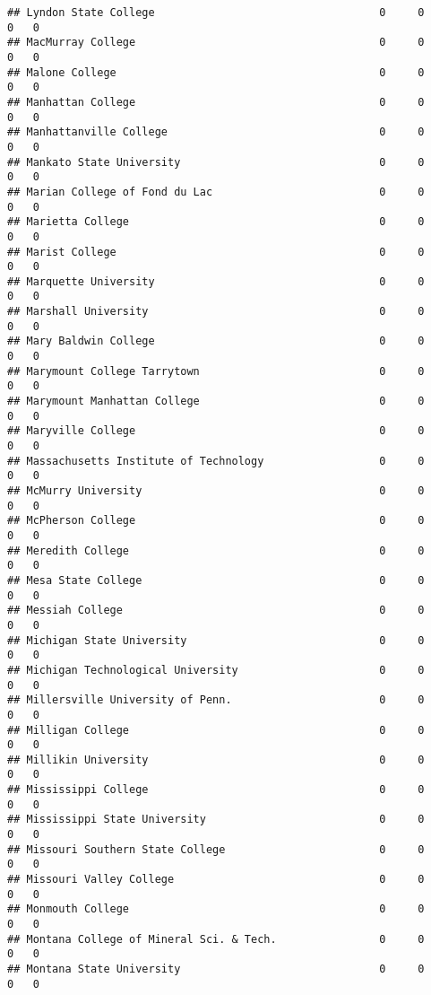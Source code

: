 \documentclass[
]{article}
\begin{document}
\begin{verbatim}
## Lyndon State College                                   0     0        0   0
## MacMurray College                                      0     0        0   0
## Malone College                                         0     0        0   0
## Manhattan College                                      0     0        0   0
## Manhattanville College                                 0     0        0   0
## Mankato State University                               0     0        0   0
## Marian College of Fond du Lac                          0     0        0   0
## Marietta College                                       0     0        0   0
## Marist College                                         0     0        0   0
## Marquette University                                   0     0        0   0
## Marshall University                                    0     0        0   0
## Mary Baldwin College                                   0     0        0   0
## Marymount College Tarrytown                            0     0        0   0
## Marymount Manhattan College                            0     0        0   0
## Maryville College                                      0     0        0   0
## Massachusetts Institute of Technology                  0     0        0   0
## McMurry University                                     0     0        0   0
## McPherson College                                      0     0        0   0
## Meredith College                                       0     0        0   0
## Mesa State College                                     0     0        0   0
## Messiah College                                        0     0        0   0
## Michigan State University                              0     0        0   0
## Michigan Technological University                      0     0        0   0
## Millersville University of Penn.                       0     0        0   0
## Milligan College                                       0     0        0   0
## Millikin University                                    0     0        0   0
## Mississippi College                                    0     0        0   0
## Mississippi State University                           0     0        0   0
## Missouri Southern State College                        0     0        0   0
## Missouri Valley College                                0     0        0   0
## Monmouth College                                       0     0        0   0
## Montana College of Mineral Sci. & Tech.                0     0        0   0
## Montana State University                               0     0        0   0

\end{verbatim}
\end{document}

